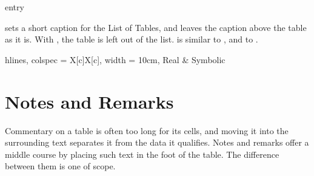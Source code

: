 \begin{codedescribe}[
        key,
        new=2021L
    ]{entry}
    \begin{codesyntax}
    \end{codesyntax}
     sets a short caption for the List of Tables, and leaves the caption above the table as it is. With , the table is left out of the list.  is similar to , and  to .

    \begin{codestore}[st=outer:entry]
        \begin{talltblr}[
            caption = {The long caption, which is typeset above the table},
            entry = {The short caption, for the List of Tables},
            ]{
            hlines, colspec = {X[c]X[c]}, width = 10cm,
            }
            Real & Symbolic
        \end{talltblr}\end{codestore}
    \begin{center}
    \end{center}
\end{codedescribe}

\section{Notes and Remarks}\label{outer:notes}
Commentary on a table is often too long for its cells, and moving it into the surrounding text separates it from the data it qualifies. Notes and remarks offer a middle course by placing such text in the foot of the table. The difference between them is one of scope.

